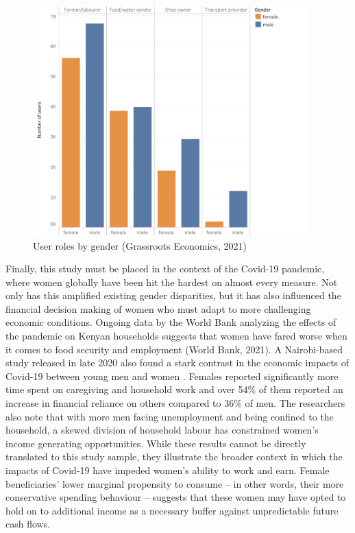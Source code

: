 \documentclass[12pt]{article}
\begin{document}
\begin{figure}[H]
    \centering
    \includegraphics[width=0.95\textwidth]{figures/fig_10}
    \caption{User roles by gender (Grassroots Economics, 2021)}
    \label{fig:fig10}
\end{figure}

Finally, this study must be placed in the context of the Covid-19 pandemic, where women globally have been hit the hardest on almost every measure. Not only has this amplified existing gender disparities, but it has also influenced the financial decision making of women who must adapt to more challenging economic conditions. Ongoing data by the World Bank analyzing the effects of the pandemic on Kenyan households suggests that women have fared worse when it comes to food security and employment (World Bank, 2021). A Nairobi-based study released in late 2020 also found a stark contrast in the economic impacts of Covid-19 between young men and women \citep{Decker2021covid}. Females reported significantly more time spent on caregiving and household work and over 54\% of them reported an increase in financial reliance on others compared to 36\% of men. The researchers also note that with more men facing unemployment and being confined to the household, a skewed division of household labour has constrained women’s income generating opportunities. While these results cannot be directly translated to this study sample, they illustrate the broader context in which the impacts of Covid-19 have impeded women’s ability to work and earn. Female beneficiaries’ lower marginal propensity to consume – in other words, their more conservative spending behaviour – suggests that these women may have opted to hold on to additional income as a necessary buffer against unpredictable future cash flows.
\end{document}
